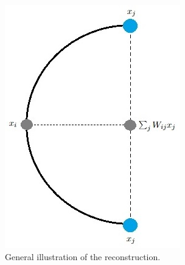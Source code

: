 \begin{figure}[!]
     \centering
     \begin{subfigure}[t]{0.47\textwidth}
         \centering
         \includegraphics[width=\textwidth]{images/lle_illustraion.jpg}
         \caption{General illustration of the reconstruction.}
         \label{subfig:lle_illustraion}
     \end{subfigure}
     \hfill
     \begin{subfigure}[t]{0.40\textwidth}
         \centering

\end{subfigure}
\end{figure}

